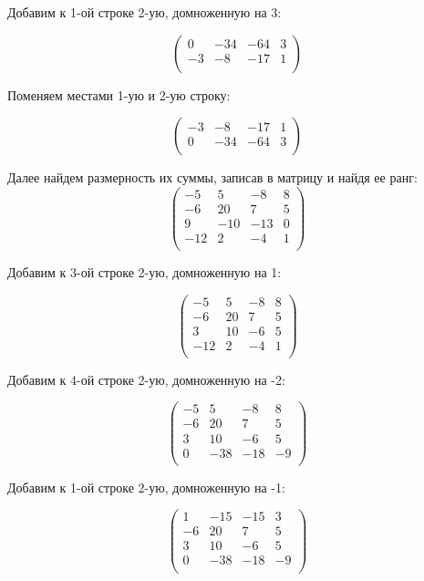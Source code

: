 	Добавим к 1-ой строке 2-ую, домноженную на 3:
	
	\[
	\begin{pmatrix}
	0 & -34 & -64 & 3 \\
	-3 & -8 & -17 & 1 \\
	\end{pmatrix}
	\]
	
	Поменяем местами 1-ую и 2-ую строку:
	
	\[
	\begin{pmatrix}
	-3 & -8 & -17 & 1 \\
	0 & -34 & -64 & 3 \\
	\end{pmatrix}
	\]
	
	
	Далее найдем размерность их суммы, записав в матрицу и найдя ее ранг: \\
	\[
	\begin{pmatrix}
	-5 & 5 & -8 & 8 \\
	-6 & 20 & 7 & 5 \\
	9 & -10 & -13 & 0 \\
	-12 & 2 & -4 & 1 \\
	\end{pmatrix}
	\]
	
	Добавим к 3-ой строке 2-ую, домноженную на 1:
	
	\[
	\begin{pmatrix}
	-5 & 5 & -8 & 8 \\
	-6 & 20 & 7 & 5 \\
	3 & 10 & -6 & 5 \\
	-12 & 2 & -4 & 1 \\
	\end{pmatrix}
	\]
	
	Добавим к 4-ой строке 2-ую, домноженную на -2:
	
	\[
	\begin{pmatrix}
	-5 & 5 & -8 & 8 \\
	-6 & 20 & 7 & 5 \\
	3 & 10 & -6 & 5 \\
	0 & -38 & -18 & -9 \\
	\end{pmatrix}
	\]
	
	Добавим к 1-ой строке 2-ую, домноженную на -1:
	
	\[
	\begin{pmatrix}
	1 & -15 & -15 & 3 \\
	-6 & 20 & 7 & 5 \\
	3 & 10 & -6 & 5 \\
	0 & -38 & -18 & -9 \\
	\end{pmatrix}
	\]
	
